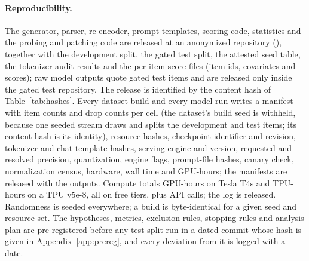\paragraph{Reproducibility.}
The generator, parser, re-encoder, prompt templates, scoring code, statistics and the probing and patching code are released at an anonymized repository (\anonrepo{}), together with the development split, the gated test split, the attested seed table, the tokenizer-audit results and the per-item score files (item ids, covariates and scores); raw model outputs quote gated test items and are released only inside the gated test repository. The release is identified by the content hash of Table~\ref{tab:hashes}. Every dataset build and every model run writes a manifest with item counts and drop counts per cell (the dataset's build seed is withheld, because one seeded stream draws and splits the development and test items; its content hash is its identity), resource hashes, checkpoint identifier and revision, tokenizer and chat-template hashes, serving engine and version, requested and resolved precision, quantization, engine flags, prompt-file hashes, canary check, normalization census, hardware, wall time and GPU-hours; the manifests are released with the outputs. Compute totals  GPU-hours on Tesla T4s and  TPU-hours on a TPU v5e-8, all on free tiers, plus  API calls; the log is released. Randomness is seeded everywhere; a build is byte-identical for a given seed and resource set. The hypotheses, metrics, exclusion rules, stopping rules and analysis plan are pre-registered before any test-split run in a dated commit whose hash is given in Appendix~\ref{app:prereg}, and every deviation from it is logged with a date.

